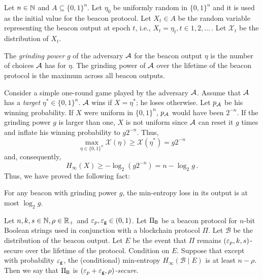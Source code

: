 Let $n \in \mathbb{N}$ and $A \subseteq \{0,1\}^n$.
Let $\eta_0$ be uniformly random in $\{0,1\}^n$ 
and it is used as the initial value for the beacon protocol. 
Let $X_t \in A$ be the random variable 
representing the beacon output at epoch $t$, 
i.e., $X_t = \eta_t, t \in 1, 2, \ldots$\,. 
Let $\mathcal{X}_t$ be the distribution of $X_t$. 

\begin{definition}\label{def:grinding-power-num-choices}
The \emph{grinding power} $g$ of the adversary $\mathcal{A}$ 
for the beacon output $\eta$
is the number of choices $\mathcal{A}$ has for $\eta$. 
The grinding power of $\mathcal{A}$ over 
the lifetime of the beacon protocol
is the maximum across all beacon outputs.
\end{definition}

Consider a simple one-round game played by the adversary $\mathcal{A}$. 
Assume that $\mathcal{A}$ has a \emph{target} $\eta^* \in \{0,1\}^n$. 
$\mathcal{A}$ wins if $X = \eta^*$; he loses otherwise. 
Let $p_{\mathcal{A}}$ be his winning probability. 
If $X$ were uniform in $\{0,1\}^n$, 
$p_{\mathcal{A}}$ would have been $2^{-n}$. 
If the grinding power $g$ is larger than one, 
$X$ is not uniform since 
$\mathcal{A}$ can reset it $g$ times 
and inflate his winning probability to $g 2^{-n}$. 
Thus, 
$$ 
    \max_{\eta \in \{0,1\}^n} \mathcal{X}(\eta) \geq \mathcal{X}(\eta^*) = g 2^{-n}
$$ 
and, consequently, 
$$
    H_\infty(X) \geq -\log_2 (g 2^{-n}) = n - \log_2 g
    \,.
$$
Thus, we have proved the following fact:

\begin{fact}\label{fact:min-entropy-grinding-power}
  For any beacon with grinding power $g$, 
  the min-entropy loss in its output is at most $\log_2 g$.
\end{fact}

\begin{definition}\label{def:beacon-security}
    Let $n,k,s \in \mathbb{N}, \rho \in \mathbb{R}_+$ and $\mathsf{\varepsilon}_p, \mathsf{\varepsilon_g} \in (0,1)$.
    Let $\Pi_{\mathsf{B}}$ be a beacon protocol for $n$-bit Boolean strings 
    used in conjunction with a blockchain protocol $\Pi$. 
    Let $\mathcal{B}$ be the distribution of the beacon output.
    Let $E$ be the event that $\Pi$ remains $(\mathsf{\varepsilon}_p, k, s)$-secure over the lifetime of the protocol. 
    Condition on $E$. 
    Suppose that except with probability $\mathsf{\varepsilon_g}$, 
    the (conditional) min-entropy 
    $H_\infty(\mathcal{B} \mid E)$ is at least $n - \rho$. 
    Then we say that $\Pi_{\mathsf{B}}$ is \emph{$(\mathsf{\varepsilon}_p + \mathsf{\varepsilon_g}, \rho)$-secure}.
\end{definition}



